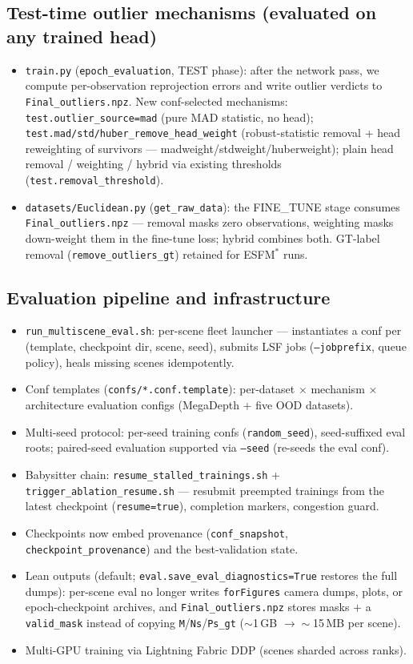 \documentclass[10pt]{article}
\newcommand{\code}[1]{\texttt{\small #1}}
\begin{document}
\subsection{Test-time outlier mechanisms (evaluated on any trained head)}
\begin{itemize}\itemsep2pt
\item \code{train.py} (\code{epoch\_evaluation}, TEST phase): after the network pass, we
compute per-observation reprojection errors and write outlier verdicts to
\code{Final\_outliers.npz}. New conf-selected mechanisms:
\code{test.outlier\_source=mad} (pure MAD statistic, no head);
\code{test.mad/std/huber\_remove\_head\_weight} (robust-statistic removal + head
reweighting of survivors --- madweight/stdweight/huberweight); plain head removal /
weighting / hybrid via existing thresholds (\code{test.removal\_threshold}).
\item \code{datasets/Euclidean.py} (\code{get\_raw\_data}): the FINE\_TUNE stage consumes
\code{Final\_outliers.npz} --- removal masks zero observations, weighting masks
down-weight them in the fine-tune loss; hybrid combines both. GT-label removal
(\code{remove\_outliers\_gt}) retained for ESFM$^{\ast}$ runs.
\end{itemize}

\subsection{Evaluation pipeline and infrastructure}
\begin{itemize}\itemsep2pt
\item \code{run\_multiscene\_eval.sh}: per-scene fleet launcher --- instantiates a conf
per (template, checkpoint dir, scene, seed), submits LSF jobs
(\code{--jobprefix}, queue policy), heals missing scenes idempotently.
\item Conf templates (\code{confs/*.conf.template}): per-dataset $\times$ mechanism
$\times$ architecture evaluation configs (MegaDepth + five OOD datasets).
\item Multi-seed protocol: per-seed training confs (\code{random\_seed}), seed-suffixed
eval roots; paired-seed evaluation supported via \code{--seed} (re-seeds the eval conf).
\item Babysitter chain: \code{resume\_stalled\_trainings.sh} +
\code{trigger\_ablation\_resume.sh} --- resubmit preempted trainings from the latest
checkpoint (\code{resume=true}), completion markers, congestion guard.
\item Checkpoints now embed provenance (\code{conf\_snapshot},
\code{checkpoint\_provenance}) and the best-validation state.
\item Lean outputs (default; \code{eval.save\_eval\_diagnostics=True} restores the full
dumps): per-scene eval no longer writes \code{forFigures} camera dumps, plots, or
epoch-checkpoint archives, and \code{Final\_outliers.npz} stores masks $+$ a
\code{valid\_mask} instead of copying \code{M}/\code{Ns}/\code{Ps\_gt}
($\sim$1\,GB $\to\sim$15\,MB per scene).
\item Multi-GPU training via Lightning Fabric DDP (scenes sharded across ranks).
\end{itemize}
\end{document}
